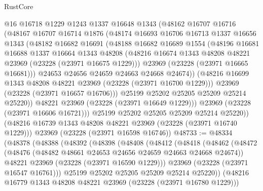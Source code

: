 \begin{lexlean}{RustCore}
\begin{coremodule}
            @16
            @16718
            @1229
            @1243
            @1337
            @16648
            @1343
            (@48162
              @16707
              @16716
              (@48167
                @16707
                @16714
                @1876
                (@48174
                  @16693
                  @16706
                  @16713
                  @1337
                  @16656
                  @1343
                  (@48182
                    @16682
                    @16691
                    (@48188
                      @16682
                      @16689
                      @1554
                      (@48196
                        @16681
                        @16688
                        @1337
                        @16664
                        @1343
                        @48208
                        (@48216 @16674 @1343 @48208 @48221 @23969 (@23228 (@23971 @16675 @1229)))
                        @23969
                        (@23228 (@23971 @16665 @16681)))
                      @24653
                      @24656
                      @24659
                      @24663
                      @24668
                      @24674))
                  (@48216 @16699 @1343 @48208 @48221 @23969 (@23228 (@23971 @16700 @1229)))
                  @23969
                  (@23228 (@23971 @16657 @16706)))
                @25199
                @25202
                @25205
                @25209
                @25214
                @25220))
            @48221
            @23969
            (@23228 (@23971 @16649 @1229)))
          @23969
          (@23228 (@23971 @16606 @16721)))
        @25199
        @25202
        @25205
        @25209
        @25214
        @25220))
    (@48216 @16739 @1343 @48208 @48221 @23969 (@23228 (@23971 @16740 @1229)))
    @23969
    (@23228 (@23971 @16598 @16746))
@48733 := @48334
    (@48378
      (@48388
        (@48392
          (@48398
            (@48408
              (@48412
                (@48418
                  (@48462
                    (@48472
                      (@48476 (@48482 @48661 @24653 @24656 @24659 @24663 @24668 @24674))
                      @48221
                      @23969
                      (@23228 (@23971 @16590 @1229)))
                    @23969
                    (@23228 (@23971 @16547 @16761)))
                  @25199
                  @25202
                  @25205
                  @25209
                  @25214
                  @25220))
              (@48216 @16779 @1343 @48208 @48221 @23969 (@23228 (@23971 @16780 @1229)))

\end{coremodule}
\end{lexlean}
